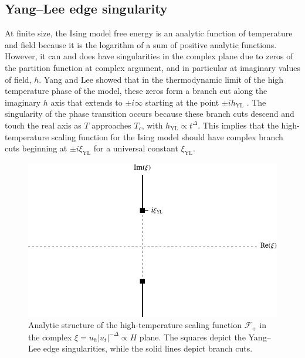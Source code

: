 \documentclass[
aps,
pre,
preprint,
longbibliography,
floatfix
]{revtex4-2}
\begin{document}
\subsection{Yang--Lee edge singularity}

At finite size, the Ising model free energy is an analytic function of
temperature and field because it is the logarithm of a sum of positive analytic
functions. However, it can and does have singularities in the complex plane due
to zeros of the partition function at complex argument, and in particular at
imaginary values of field, $h$. Yang and Lee showed that in the thermodynamic
limit of the high temperature phase of the model, these zeros form a branch cut
along the imaginary $h$ axis that extends to $\pm i\infty$ starting at the
point $\pm ih_{\mathrm{YL}}$ \cite{Yang_1952_Statistical, Lee_1952_Statistical}.
The singularity of the phase transition occurs because these branch cuts
descend and touch the real axis as $T$ approaches $T_c$, with
$h_{\mathrm{YL}}\propto t^{\Delta}$. This implies that the
high-temperature scaling function for the Ising model should have complex
branch cuts beginning at $\pm i\xi_{\mathrm{YL}}$ for a universal constant
$\xi_{\mathrm{YL}}$.

\begin{figure}
  \includegraphics{figs/F_higher_singularities.pdf}
  \caption{
    Analytic structure of the high-temperature scaling function $\mathcal F_+$
    in the complex $\xi=u_h|u_t|^{-\Delta}\propto H$ plane. The squares
    depict the Yang--Lee edge singularities, while the solid lines depict
    branch cuts.
  } \label{fig:higher.singularities}
\end{figure}
\end{document}
